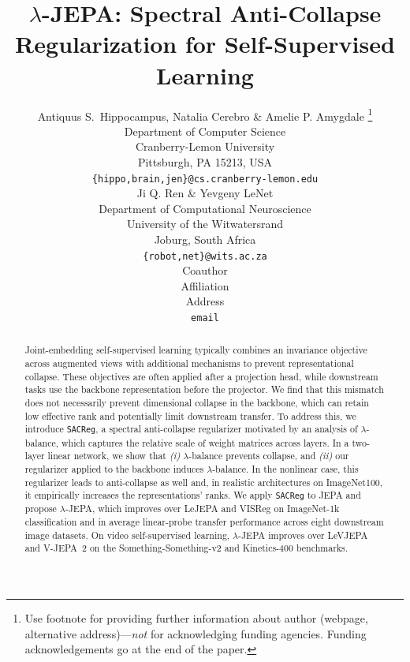 \documentclass{article} %
\title{$\lambda$-JEPA: Spectral Anti-Collapse Regularization for Self-Supervised Learning}
\author{Antiquus S.~Hippocampus, Natalia Cerebro \& Amelie P. Amygdale \thanks{ Use footnote for providing further information
about author (webpage, alternative address)---\emph{not} for acknowledging
funding agencies.  Funding acknowledgements go at the end of the paper.} \\
Department of Computer Science\\
Cranberry-Lemon University\\
Pittsburgh, PA 15213, USA \\
\texttt{\{hippo,brain,jen\}@cs.cranberry-lemon.edu} \\
\And
Ji Q. Ren \& Yevgeny LeNet \\
Department of Computational Neuroscience \\
University of the Witwatersrand \\
Joburg, South Africa \\
\texttt{\{robot,net\}@wits.ac.za} \\
\AND
Coauthor \\
Affiliation \\
Address \\
\texttt{email}
}
\theoremstyle{remark}
\begin{document}



 
\maketitle

\begin{abstract}
Joint-embedding self-supervised learning typically combines an invariance objective across augmented views with additional mechanisms to prevent representational collapse. These objectives are often applied after a projection head, while downstream tasks use the backbone representation before the projector. We find that this mismatch does not necessarily prevent dimensional collapse in the backbone, which can retain low effective rank and potentially limit downstream transfer. To address this, we introduce \texttt{SACReg}, a spectral anti-collapse regularizer motivated by an analysis of $\lambda$-balance, which captures the relative scale of weight matrices across layers. In a two-layer linear network, we show that \emph{(i)} $\lambda$-balance prevents collapse, and \emph{(ii)} our regularizer applied to the backbone induces $\lambda$-balance. In the nonlinear case, this regularizer leads to anti-collapse as well and, in realistic architectures on ImageNet100, it empirically increases the representations' ranks. We apply \texttt{SACReg} to JEPA and propose $\lambda$-JEPA, which improves over LeJEPA and VISReg on ImageNet-1k classification and in average linear-probe transfer performance across eight downstream image datasets. On video self-supervised learning, $\lambda$-JEPA improves over LeVJEPA and V-JEPA~2 on the Something-Something-v2 and Kinetics-400 benchmarks.






\end{abstract}
\end{document}
